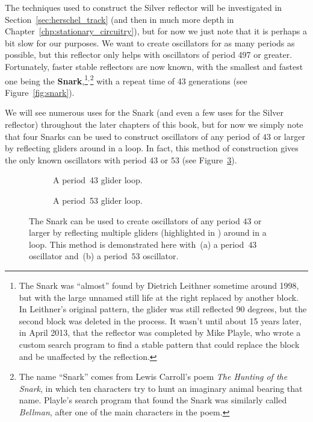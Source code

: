 The techniques used to construct the Silver reflector will be investigated in Section~\ref{sec:herschel_track} (and then in much more depth in Chapter~\ref{chp:stationary_circuitry}), but for now we just note that it is perhaps a bit slow for our purposes. We want to create oscillators for as many periods as possible, but this reflector only helps with oscillators of period 497 or greater. Fortunately, faster stable reflectors are now known, with the smallest and fastest one being the \textbf{Snark},\footnote{The Snark was ``almost'' found by Dietrich Leithner sometime around 1998, but with the large unnamed still life at the right replaced by another block. In Leithner's original pattern, the glider was still reflected 90 degrees, but the second block was deleted in the process. It wasn't until about 15 years later, in April 2013, that the reflector was completed by Mike Playle, who wrote a custom search program to find a stable pattern that could replace the block and be unaffected by the reflection.}$^{,}$\footnote{The name ``Snark'' comes from Lewis Carroll's poem \emph{The Hunting of the Snark}, in which ten characters try to hunt an imaginary animal bearing that name. Playle's search program that found the Snark was similarly called \emph{Bellman}, after one of the main characters in the poem.} with a repeat time of 43 generations (see Figure~\ref{fig:snark}).

We will see numerous uses for the Snark (and even a few uses for the Silver reflector) throughout the later chapters of this book, but for now we simply note that four Snarks can be used to construct oscillators of any period of $43$ or larger by reflecting gliders around in a loop. In fact, this method of construction gives the only known oscillators with period $43$ or $53$ (see Figure~\ref{fig:period_43_53}).

\begin{figure}[!htb]
	\centering
	\begin{subfigure}{.5\textwidth}
		\centering
		\caption{A period~43 glider loop.}
		\label{fig:period_43}
	\end{subfigure}%
	\begin{subfigure}{.5\textwidth}
		\centering
		\caption{A period~53 glider loop.}
		\label{fig:period_53}
	\end{subfigure}
	\caption{The Snark can be used to create oscillators of any period $43$ or larger by reflecting multiple gliders (highlighted in ) around in a loop. This method is demonstrated here with~(a) a period~$43$ oscillator and~(b) a period~$53$ oscillator.}
	\label{fig:period_43_53}
\end{figure}


